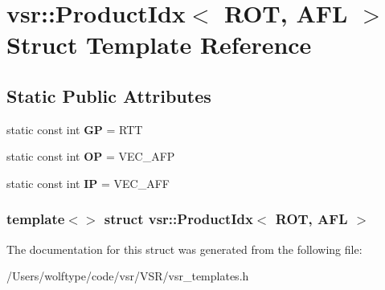 \hypertarget{structvsr_1_1_product_idx_3_01_r_o_t_00_01_a_f_l_01_4}{\section{vsr\-:\-:Product\-Idx$<$ R\-O\-T, A\-F\-L $>$ Struct Template Reference}
\label{structvsr_1_1_product_idx_3_01_r_o_t_00_01_a_f_l_01_4}
}
\subsection*{Static Public Attributes}
\begin{DoxyCompactItemize}
\item 
\hypertarget{structvsr_1_1_product_idx_3_01_r_o_t_00_01_a_f_l_01_4_a5b1105ba52765fa4866c5c53a9907382}{static const int {\bfseries G\-P} = R\-T\-T}\label{structvsr_1_1_product_idx_3_01_r_o_t_00_01_a_f_l_01_4_a5b1105ba52765fa4866c5c53a9907382}

\item 
\hypertarget{structvsr_1_1_product_idx_3_01_r_o_t_00_01_a_f_l_01_4_ac03712b65ba83bd86e626cf9b51e2e81}{static const int {\bfseries O\-P} = V\-E\-C\-\_\-\-A\-F\-P}\label{structvsr_1_1_product_idx_3_01_r_o_t_00_01_a_f_l_01_4_ac03712b65ba83bd86e626cf9b51e2e81}

\item 
\hypertarget{structvsr_1_1_product_idx_3_01_r_o_t_00_01_a_f_l_01_4_a6a197cc78cb63351a557fc5de03de348}{static const int {\bfseries I\-P} = V\-E\-C\-\_\-\-A\-F\-F}\label{structvsr_1_1_product_idx_3_01_r_o_t_00_01_a_f_l_01_4_a6a197cc78cb63351a557fc5de03de348}

\end{DoxyCompactItemize}
\subsubsection*{template$<$$>$ struct vsr\-::\-Product\-Idx$<$ R\-O\-T, A\-F\-L $>$}



The documentation for this struct was generated from the following file\-:\begin{DoxyCompactItemize}
\item 
/\-Users/wolftype/code/vsr/\-V\-S\-R/vsr\-\_\-templates.\-h\end{DoxyCompactItemize}
